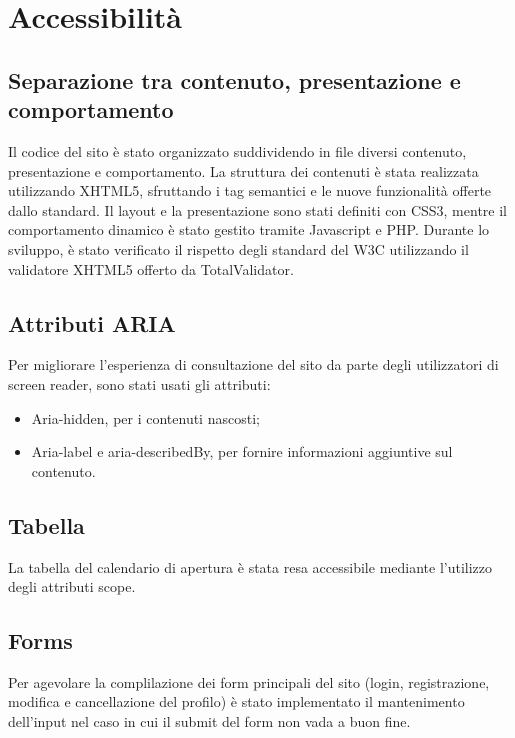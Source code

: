 \section{Accessibilità}
\subsection{Separazione tra contenuto, presentazione e comportamento}
Il codice del sito è stato organizzato suddividendo in file diversi contenuto, presentazione e comportamento. La struttura dei contenuti è stata realizzata utilizzando XHTML5, sfruttando i tag semantici e le nuove funzionalità offerte dallo standard. Il layout e la presentazione sono stati definiti con CSS3, mentre il comportamento dinamico è stato gestito tramite Javascript e PHP. Durante lo sviluppo, è stato verificato il rispetto degli standard del W3C utilizzando il validatore XHTML5 offerto da TotalValidator.
\subsection{Attributi ARIA}
Per migliorare l'esperienza di consultazione del sito da parte degli utilizzatori di screen reader, sono stati usati gli attributi:
\begin{itemize}
    \item Aria-hidden, per i contenuti nascosti;
    \item Aria-label e aria-describedBy, per fornire informazioni aggiuntive sul contenuto.
\end{itemize}
\subsection{Tabella}
La tabella del calendario di apertura è stata resa accessibile mediante l'utilizzo degli attributi scope.
\subsection{Forms}
Per agevolare la complilazione dei form principali del sito (login, registrazione, modifica e cancellazione del profilo) è stato implementato il mantenimento dell'input nel caso in cui il submit del form non vada a buon fine.
